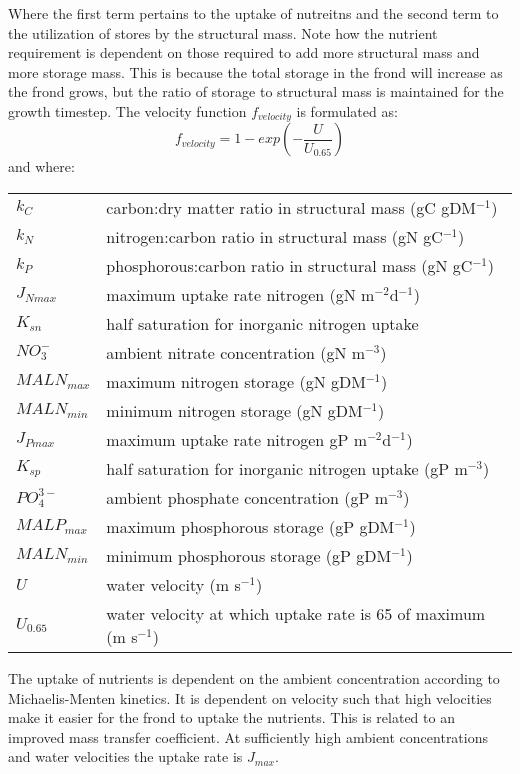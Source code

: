 \documentclass{deltares_manual}
\begin{document}
Where the first term pertains to the uptake of nutreitns and the second term to the utilization of stores by the structural mass. Note how the nutrient requirement is dependent on those required to add more structural mass and more storage mass. This is because the total storage in the frond will increase as the frond grows, but the ratio of storage to structural mass is maintained for the growth timestep. The velocity function $f_{velocity}$ is formulated as:
\[f_{velocity} = 1-exp(-\frac{U}{U_{0.65}})\]
and where:\\
\begin{tabular}{ll}
$k_C$        & carbon:dry matter ratio in structural mass (gC gDM$^{-1}$)\\
$k_N$        & nitrogen:carbon ratio in structural mass (gN gC$^{-1}$)\\
$k_P$        & phosphorous:carbon ratio in structural mass (gN gC$^{-1}$)\\
$J_{Nmax}$   & maximum uptake rate nitrogen (gN m$^{-2}$d$^{-1}$)\\
$K_{sn}$     & half saturation for inorganic nitrogen uptake\\
$NO_3^-$     & ambient nitrate concentration (gN m$^{-3}$)\\
$MALN_{max}$ & maximum nitrogen storage (gN gDM$^{-1}$)\\
$MALN_{min}$ & minimum nitrogen storage (gN gDM$^{-1}$)\\
$J_{Pmax}$   & maximum uptake rate nitrogen gP m$^{-2}$d$^{-1}$)\\
$K_{sp}$     & half saturation for inorganic nitrogen uptake (gP m$^{-3}$)\\
$PO_4^{3-}$  & ambient phosphate concentration (gP m$^{-3}$)\\
$MALP_{max}$ & maximum phosphorous storage (gP gDM$^{-1}$)\\
$MALN_{min}$ & minimum phosphorous storage (gP gDM$^{-1}$)\\
$U$          & water velocity (m s$^{-1}$)\\
$U_{0.65}$   & water velocity at which uptake rate is 65 of maximum (m s$^{-1}$)\\
\end{tabular}

The uptake of nutrients is dependent on the ambient concentration according to Michaelis-Menten kinetics. It is dependent on velocity such that high velocities make it easier for the frond to uptake the nutrients. This is related to an improved mass transfer coefficient. At sufficiently high ambient concentrations and water velocities the uptake rate is $J_{max}$.
\end{document}
